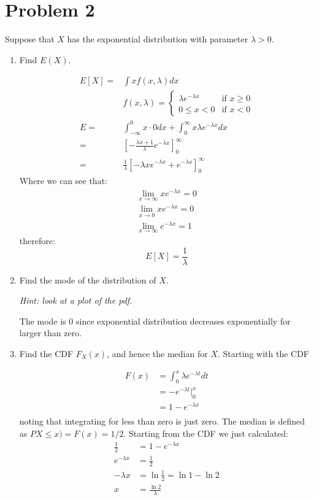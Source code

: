 \documentclass{article}
\newcommand{\1}{\mathbf{1}}
\begin{document}
\section*{Problem 2}
Suppose that $X$ has the exponential distribution with parameter $\lambda > 0$.
\begin{enumerate}
    \item Find $E(X)$.
    
    \begin{align*}
        E[X] = &\int xf(x,\lambda)dx \\
        & f(x, \lambda) = \begin{cases} 
	            \lambda e^{-\lambda x} &\mbox{if } x \geq 0 \\
	            0 \leq x < 0 &\mbox{if } x < 0
            \end{cases}  \\
        E = &\int_{-\infty}^0 x \cdot 0 dx + \int_0^\infty x \lambda e^{-\lambda x} dx \\
          = &\left[ -\frac{\lambda x + 1}{\lambda} e^{-\lambda x} \right]_0^\infty \\
          = &\frac{1}{\lambda} \left[ -\lambda x e^{-\lambda x} + e^{-\lambda x} \right]_0^\infty
    \end{align*}
    Where we can see that:
    \begin{align*}
        \lim_{x\rightarrow\infty} x e^{-\lambda x}  = 0 \\
        \lim_{x\rightarrow 0} x e^{-\lambda x}  = 0 \\
        \lim_{x\rightarrow\infty} e^{-\lambda x}  = 1
    \end{align*}
    therefore:
    $$E[X] = \frac{1}{\lambda}$$
    
    \item Find the mode of the distribution of $X$.\par {\it Hint: look at a plot of the pdf.}
    
    The mode is 0 since exponential distribution decreases exponentially for larger than zero.
    
    \item Find the CDF $F_X(x)$, and hence the median for $X$. Starting with the CDF
    
    \begin{align*}
        F(x) &= \int_{0}^{x} \lambda e^{-\lambda t} dt \\
            &= -e^{-\lambda t}|_{0}^{x} \\
            &= 1-e^{-\lambda x} \\
    \end{align*}
    noting that integrating for less than zero is just zero. The median is defined as $PX\leq x) = F(x) = 1/2$. Starting from the CDF we just calculated:
    \begin{align*}
        \frac{1}{2} &= 1 - e^{-\lambda x} \\
        e^{-\lambda x} &= \frac{1}{2} \\
        -\lambda{x} &= \ln\frac{1}{2} = \ln1 - \ln2 \\
        x &= \frac{\ln2}{\lambda}
    \end{align*}
    

\end{enumerate}
\end{document}
